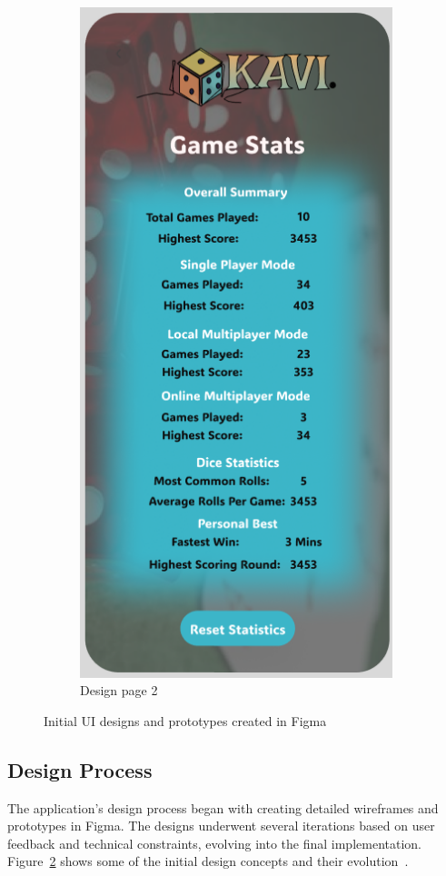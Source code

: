 \begin{figure}[ht!]
\begin{subfigure}[b]{0.48\textwidth}
        \includegraphics[scale=0.45]{img/stats.png}
        \caption{Design page 2}
        \label{fig:figma_design2}
    \end{subfigure}
    \caption{Initial UI designs and prototypes created in Figma}
    \label{fig:figma_designs}
\end{figure}

\subsection{Design Process}
The application's design process began with creating detailed wireframes and prototypes in Figma. The designs underwent several iterations based on user feedback and technical constraints, evolving into the final implementation. Figure~\ref{fig:figma_designs} shows some of the initial design concepts and their evolution~\cite{bib:kavifigma}.

